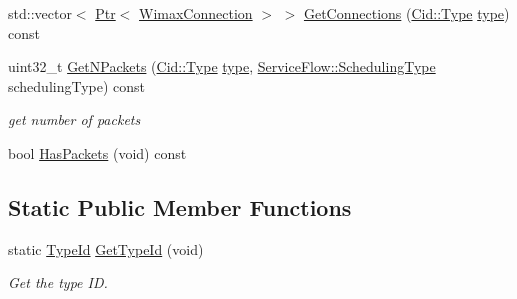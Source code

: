 \begin{DoxyCompactItemize}
\item 
std\+::vector$<$ \hyperlink{classns3_1_1Ptr}{Ptr}$<$ \hyperlink{classns3_1_1WimaxConnection}{Wimax\+Connection} $>$ $>$ \hyperlink{classns3_1_1ConnectionManager_a1470279a9b34c5b5c16187700951a867}{Get\+Connections} (\hyperlink{classns3_1_1Cid_a10b8f92080ca5790e65a0bfa2f557e0a}{Cid\+::\+Type} \hyperlink{visualizer-ideas_8txt_add98db9e15e2a58cf2b57623e7aa893a}{type}) const 
\item 
uint32\+\_\+t \hyperlink{classns3_1_1ConnectionManager_a9c0555980d7480c09bafaf1049455f55}{Get\+N\+Packets} (\hyperlink{classns3_1_1Cid_a10b8f92080ca5790e65a0bfa2f557e0a}{Cid\+::\+Type} \hyperlink{visualizer-ideas_8txt_add98db9e15e2a58cf2b57623e7aa893a}{type}, \hyperlink{classns3_1_1ServiceFlow_a7990ba10be1e098328fd1e6382a26235}{Service\+Flow\+::\+Scheduling\+Type} scheduling\+Type) const 
\begin{DoxyCompactList}\small\item\em get number of packets \end{DoxyCompactList}\item 
bool \hyperlink{classns3_1_1ConnectionManager_a16e080f357b0f74b1c9e0a62bdb087ba}{Has\+Packets} (void) const 
\end{DoxyCompactItemize}
\subsection*{Static Public Member Functions}
\begin{DoxyCompactItemize}
\item 
static \hyperlink{classns3_1_1TypeId}{Type\+Id} \hyperlink{classns3_1_1ConnectionManager_a5016940f1be074bfeb75598bdbd8eabc}{Get\+Type\+Id} (void)
\begin{DoxyCompactList}\small\item\em Get the type ID. \end{DoxyCompactList}\end{DoxyCompactItemize}
